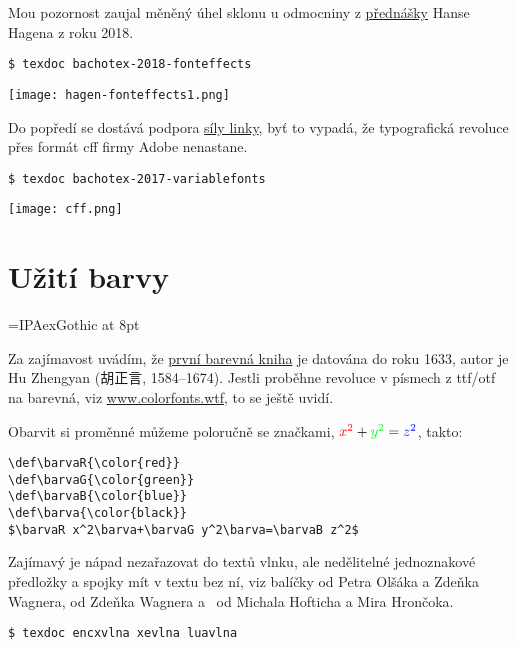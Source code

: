 Mou pozornost zaujal měněný úhel sklonu u odmocniny z \href{http://www.tug.org/texlive//devsrc/Master/texmf-dist/doc/context/presentations/bachotex/2018/bachotex-2018-fonteffects.pdf}{přednášky} Hanse Hagena z roku 2018.
\begin{lstlisting}
$ texdoc bachotex-2018-fonteffects
\end{lstlisting}

\noindent\hfil
\texttt{[image: hagen-fonteffects1.png]}

Do popředí se dostává podpora \href{http://www.tug.org/texlive//devsrc/Master/texmf-dist/doc/context/presentations/bachotex/2017/bachotex-2017-variablefonts.pdf}{síly linky}, byť to vypadá, že typografická revoluce přes formát cff firmy Adobe nenastane.
\begin{lstlisting}
$ texdoc bachotex-2017-variablefonts
\end{lstlisting}

\noindent\hfil
\texttt{[image: cff.png]}



\section{Užití barvy}
\font\pajovo=IPAexGothic at 8pt

Za zajímavost uvádím, že \href{https://www.thisiscolossal.com/2015/08/multicolor-printed-book-ten-bamboo-studio/}{první barevná kniha} je datována do roku 1633, autor je Hu Zhengyan ({\pajovo 胡正言}, 1584--1674). Jestli proběhne revoluce v písmech z ttf/otf na barevná, viz \href{https://www.colorfonts.wtf/}{\url{www.colorfonts.wtf}}, to se ještě uvidí.

Obarvit si proměnné můžeme poloručně se značkami,
\def\barvaR{\color{red}}%
\def\barvaG{\color{green}}%
\def\barvaB{\color{blue}}%
\def\barva{\color{black}}%
$\barvaR x^2\barva+\barvaG y^2\barva=\barvaB z^2$,
takto:

\newpage
\begin{lstlisting}
\def\barvaR{\color{red}}
\def\barvaG{\color{green}}
\def\barvaB{\color{blue}}
\def\barva{\color{black}}
$\barvaR x^2\barva+\barvaG y^2\barva=\barvaB z^2$
\end{lstlisting}


Zajímavý je nápad nezařazovat do textů vlnku, ale nedělitelné jednoznakové předložky a spojky %
mít v textu bez ní, viz balíčky \href{https://ctan.org/pkg/encxvlna}{} od Petra Olšáka a Zdeňka Wagnera, \href{https://ctan.org/pkg/xevlna}{} od Zdeňka Wagnera a~\href{https://ctan.org/pkg/luavlna}{} od Michala Hofticha a Mira Hrončoka. 
\begin{lstlisting}
$ texdoc encxvlna xevlna luavlna
\end{lstlisting}

